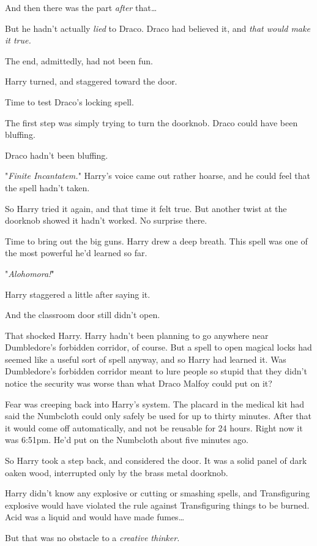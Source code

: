And then there was the part \emph{after} that{\ldots}

But he hadn't actually \emph{lied} to Draco. Draco had believed it, and
\emph{that would make it true.}

The end, admittedly, had not been fun.

Harry turned, and staggered toward the door.

Time to test Draco's locking spell.

The first step was simply trying to turn the doorknob. Draco could have been
bluffing.

Draco hadn't been bluffing.

"\emph{Finite Incantatem.}" Harry's voice came out rather hoarse, and he could
feel that the spell hadn't taken.

So Harry tried it again, and that time it felt true. But another twist at the
doorknob showed it hadn't worked. No surprise there.

Time to bring out the big guns. Harry drew a deep breath. This spell was one of
the most powerful he'd learned so far.

"\emph{Alohomora!}"

Harry staggered a little after saying it.

And the classroom door still didn't open.

That shocked Harry. Harry hadn't been planning to go anywhere near Dumbledore's
forbidden corridor, of course. But a spell to open magical locks had seemed
like a useful sort of spell anyway, and so Harry had learned it. Was
Dumbledore's forbidden corridor meant to lure people so stupid that they didn't
notice the security was worse than what Draco Malfoy could put on it?

Fear was creeping back into Harry's system. The placard in the medical kit had
said the Numbcloth could only safely be used for up to thirty minutes. After
that it would come off automatically, and not be reusable for 24 hours. Right
now it was 6:51pm. He'd put on the Numbcloth about five minutes ago.

So Harry took a step back, and considered the door. It was a solid panel of
dark oaken wood, interrupted only by the brass metal doorknob.

Harry didn't know any explosive or cutting or smashing spells, and
Transfiguring explosive would have violated the rule against Transfiguring
things to be burned. Acid was a liquid and would have made fumes{\ldots}

But that was no obstacle to a \emph{creative thinker.}

